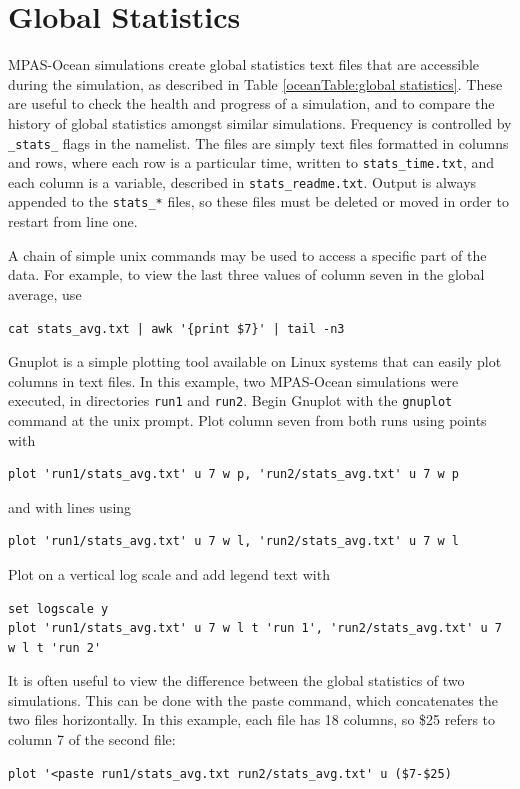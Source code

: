\chapter{Global Statistics}
\label{chap:global_statistics}

MPAS-Ocean simulations create global statistics text files that are accessible during the simulation, as described in Table \ref{oceanTable:global statistics}.  These are useful to check the health and progress of a simulation, and to compare the history of global statistics amongst similar simulations.  Frequency is controlled by \verb|_stats_| flags in the namelist.  The files are simply text files formatted in columns and rows, where each row is a particular time, written to \verb|stats_time.txt|, and each column is a variable, described in \verb|stats_readme.txt|.  Output is always appended to the {\tt stats\_*} files, so these files must be deleted or moved in order to restart from line one.

A chain of simple unix commands may be used to access a specific part of the data.  For example, to view the last three values of column seven in the global average, use
\begin{verbatim}
cat stats_avg.txt | awk '{print $7}' | tail -n3
\end{verbatim}
Gnuplot is a simple plotting tool available on Linux systems that can easily plot columns in text files.  In this example, two MPAS-Ocean simulations were executed, in directories \verb|run1| and \verb|run2|.  Begin Gnuplot with the \verb|gnuplot| command at the unix prompt.  Plot column seven from both runs using points with
\begin{verbatim}
plot 'run1/stats_avg.txt' u 7 w p, 'run2/stats_avg.txt' u 7 w p
\end{verbatim}
and with lines using
\begin{verbatim}
plot 'run1/stats_avg.txt' u 7 w l, 'run2/stats_avg.txt' u 7 w l
\end{verbatim}
Plot on a vertical log scale and add legend text with
\begin{verbatim}
set logscale y
plot 'run1/stats_avg.txt' u 7 w l t 'run 1', 'run2/stats_avg.txt' u 7 w l t 'run 2'
\end{verbatim}
It is often useful to view the difference between the global statistics of two simulations.  This can be done with the paste command, which concatenates the two files horizontally.  In this example, each file has 18 columns, so \$25 refers to column 7 of the second file:
\begin{verbatim}
plot '<paste run1/stats_avg.txt run2/stats_avg.txt' u ($7-$25)
\end{verbatim}

